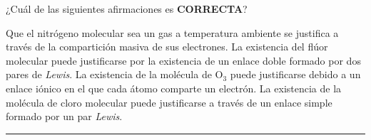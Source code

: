 \documentclass[a4paper,addpoints,14pt]{exam}
\newcommand*\chem[1]{\ensuremath{\mathrm{#1}}}
\newcommand{\halmos}{\vspace*{-4mm}
	
					\begin{flushright}
						\rule{1mm}{2.5mm} 
					\end{flushright}\vspace*{-4mm}
						
					  }
\renewcommand{\qed}{\halmos}
\begin{document}
\begin{questions}
	
		
%
%	
%	

	
	\begin{question}[1] ¿Cuál de las siguientes afirmaciones es \textbf{\small{CORRECTA}}?
		\begin{checkboxes}
			\choice Que el nitrógeno molecular sea un gas a temperatura ambiente se justifica a través de la 									compartición masiva de sus electrones.			
			\choice La existencia del flúor molecular puede justificarse por la existencia de un enlace doble formado 						por dos pares de \textit{Lewis}.		
			\choice La existencia de la molécula de $\chem{O_3}$ puede justificarse debido a un enlace iónico en el que 						cada átomo comparte un electrón.
			\CorrectChoice La existencia de la molécula de cloro molecular puede justificarse a través de un enlace simple formado por un par \textit{Lewis}.
		\end{checkboxes}	
	\end{question}
	\qed
\vspace{-1ex}
		


\end{questions}
\end{document}
